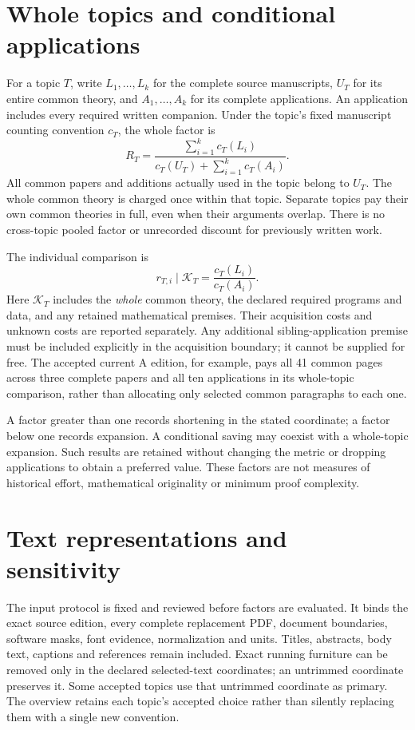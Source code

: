 \documentclass[11pt,a4paper]{article}
\begin{document}
\section{Whole topics and conditional applications}

For a topic $T$, write $L_1,\ldots,L_k$ for the complete source manuscripts,
$U_T$ for its entire common theory, and $A_1,\ldots,A_k$ for its complete
applications. An application includes every required written companion.
Under the topic's fixed manuscript counting convention $c_T$, the whole factor is
\[
 R_T=\frac{\sum_{i=1}^k c_T(L_i)}
 {c_T(U_T)+\sum_{i=1}^k c_T(A_i)}.
\]
All common papers and additions actually used in the topic belong to $U_T$.
The whole common theory is charged once within that topic. Separate topics pay
their own common theories in full, even when their arguments overlap. There is
no cross-topic pooled factor or unrecorded discount for previously written work.

The individual comparison is
\[
 r_{T,i}\mid\mathcal K_T=\frac{c_T(L_i)}{c_T(A_i)}.
\]
Here $\mathcal K_T$ includes the \emph{whole} common theory, the declared
required programs and data, and any retained mathematical premises. Their
acquisition costs and unknown costs are reported separately. Any additional
sibling-application premise must be included explicitly in the acquisition
boundary; it cannot be supplied for free. The accepted current A edition, for
example, pays all 41 common pages across three complete papers and all ten applications in its whole-topic
comparison, rather than allocating only selected common paragraphs to each one.

A factor greater than one records shortening in the stated coordinate; a factor
below one records expansion. A conditional saving may coexist with a whole-topic
expansion. Such results are retained without changing the metric or dropping
applications to obtain a preferred value. These factors are not measures of
historical effort, mathematical originality or minimum proof complexity.

\section{Text representations and sensitivity}

The input protocol is fixed and reviewed before factors are evaluated. It binds
the exact source edition, every complete replacement PDF, document boundaries,
software masks, font evidence, normalization and units. Titles, abstracts,
body text, captions and references remain included. Exact running furniture
can be removed only in the declared selected-text coordinates; an untrimmed
coordinate preserves it. Some accepted topics use that untrimmed coordinate
as primary. The overview retains each topic's accepted choice rather than
silently replacing them with a single new convention.
\end{document}
